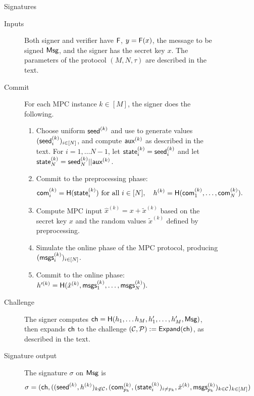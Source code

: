 \begin{figure}[p]
 \begin{minipage}[t]{1.1\textwidth}
 \begin{protocolbox}{\ttOWF Signatures}
 \begin{description}
    \item[Inputs] Both signer and verifier have $\mathsf{F}$, $y = \mathsf{F}(x)$, the
        message to be signed $\textsf{Msg}$, and the signer has the secret key $x$.  The
            parameters of the protocol $(M, N, \tau)$ are described in the text.
    \item[Commit] For each MPC instance $k\in[M]$, the signer does the following.
    \begin{enumerate}
        \item Choose uniform $\textsf{seed}^{(k)}$ and use  to generate values $(\textsf{seed}^{(k)}_i)_{i \in [N]}$, and compute  
        $\textsf{aux}^{(k)}$ as described in the text. 
        For $i=1,\ldots N-1$, let $\textsf{state}^{(k)}_i = \textsf{seed}^{(k)}_i$ and  let $\textsf{state}^{(k)}_{N} = \textsf{seed}^{(k)}_{N} || \textsf{aux}^{(k)}$.
        \item Commit to the preprocessing phase:
        \begin{align*}
        \textsf{com}^{(k)}_{i} = \textsf{H}(\textsf{state}^{(k)}_i) \text{ for all } i\in [N], \quad 
        h^{(k)} = \textsf{H}(\textsf{com}^{(k)}_{1},\ldots,\textsf{com}^{(k)}_{N}).
        \end{align*}						
        \item Compute MPC input $\hat{x}^{(k)} = x + \tilde{x}^{(k)}$ based on the secret key $x$ and the random values $\tilde{x}^{(k)}$ defined by preprocessing.
        \item Simulate the online phase of the MPC protocol, producing $(\textsf{msgs}^{(k)}_i)_{i \in [N]}$.			
        \item Commit to the online phase:
        $
         h'^{(k)}= \textsf{H}(\hat{x}^{(k)}, \textsf{msgs}_{1}^{(k)}, \ldots, \textsf{msgs}_{N}^{(k)} ).
        $
    \end{enumerate}
    
    \item[Challenge] 
    The signer computes $\textsf{ch} = \textsf{H}(h_1, \ldots h_M, h_1', \ldots, h_M',
    \textsf{Msg})$, then expands $\textsf{ch}$ to the challenge $(\mathcal{C}, \mathcal{P}) := \textsf{Expand}(\textsf{ch})$, as described in the text. 
    
    \item[Signature output]
    The signature $\sigma$ on $\textsf{Msg}$ is 
    \[
    \sigma = (\textsf{ch}, 
              ((\textsf{seed}^{(k)}, h^{(k)} )_{k\not\in\mathcal{C}}, 
              ( \textsf{com}^{(k)}_{p_k}, (\textsf{state}^{(k)}_{i})_{i\neq p_k}, \hat{x}^{(k)}, \textsf{msgs}_{p_k}^{(k)} )_{k\in\mathcal{C}})_{k\in[M]})
    \]
    

\end{description}
\end{protocolbox}
\end{minipage}
\end{figure}
